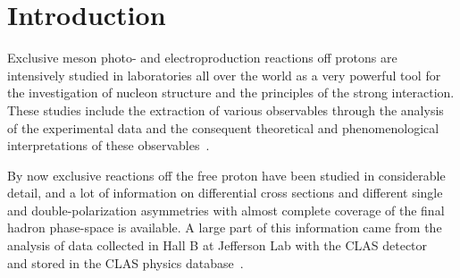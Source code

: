 \chapter{Introduction}
\label{Sect:motiv}


Exclusive meson photo- and electroproduction reactions off protons are intensively studied in laboratories all over the world as a very powerful tool for the investigation of nucleon structure and the principles of the strong interaction. These studies include the extraction of various observables through the analysis of the experimental data and the consequent theoretical and phenomenological interpretations of these observables~\cite{Krusche:2003ik,Aznauryan:2011qj,Skorodumina:2016pnb}.


By now exclusive reactions off the free proton have been studied in considerable detail, and a lot of information on differential cross sections and different single and double-polarization asymmetries with almost complete coverage of the final hadron phase-space is available. A large part of this information came from the analysis of data collected in Hall B at Jefferson Lab with the CLAS detector~\cite{Mecking:2003zu} and stored in the CLAS physics database~\cite{CLAS_DB}.



